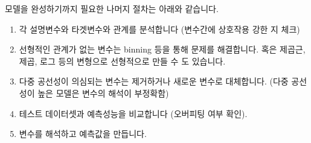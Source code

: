 \documentclass[letterpaper,10pt,english]{jupyterBook}
\begin{document}
\sphinxAtStartPar
모델을 완성하기까지 필요한 나머지 절차는 아래와 같습니다.
\begin{enumerate}
%
\item {} 
\sphinxAtStartPar
각 설명변수와 타겟변수와 관계를 분석합니다 (변수간에 상호작용 강한 지 체크)

\item {} 
\sphinxAtStartPar
선형적인 관계가 없는 변수는 binning 등을 통해 문제를 해결합니다. 혹은 제곱근, 제곱, 로그 등의 변형으로 선형적으로 만들 수 도 있습니다.

\item {} 
\sphinxAtStartPar
다중 공선성이 의심되는 변수는 제거하거나 새로운 변수로 대체합니다. (다중 공선성이 높은 모델은 변수의 해석이 부정확함)

\item {} 
\sphinxAtStartPar
테스트 데이터셋과 예측성능을 비교합니다 (오버피팅 여부 확인).

\item {} 
\sphinxAtStartPar
변수를 해석하고 예측값을 만듭니다.

\end{enumerate}
\end{document}

